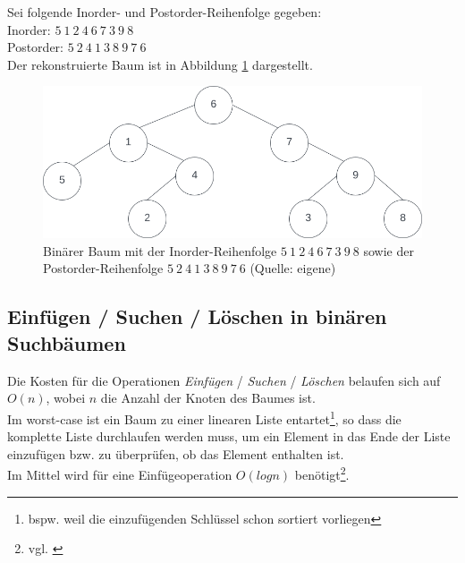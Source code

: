 \noindent
Sei folgende Inorder- und Postorder-Reihenfolge gegeben:\\

\noindent
Inorder: $5\ 1\ 2\ 4\ 6\ 7\ 3\ 9\ 8$\\
Postorder: $5\ 2\ 4\ 1\ 3\ 8\ 9\ 7\ 6$\\

\noindent
Der rekonstruierte Baum ist in Abbildung \ref{fig:inpost} dargestellt.


\begin{figure}
    \begin{center}
        \includegraphics[scale=0.4]{chapters/Datenstrukturen und Algorithmen/img/inpost}
        \caption{Binärer Baum mit der Inorder-Reihenfolge $5\ 1\ 2\ 4\ 6\ 7\ 3\ 9\ 8$ sowie der Postorder-Reihenfolge $5\ 2\ 4\ 1\ 3\ 8\ 9\ 7\ 6$  (Quelle: eigene)}
        \label{fig:inpost}
    \end{center}
\end{figure}


\subsection{Einfügen / Suchen / Löschen in binären Suchbäumen}

Die Kosten für die Operationen \textit{Einfügen} / \textit{Suchen} / \textit{Löschen} belaufen sich auf $O(n)$, wobei $n$ die Anzahl der Knoten des Baumes ist.\\
Im worst-case ist ein Baum zu einer linearen Liste entartet\footnote{
    bspw. weil die einzufügenden Schlüssel schon sortiert vorliegen
}, so dass die komplette Liste durchlaufen werden muss, um ein Element in das Ende der Liste einzufügen bzw. zu überprüfen, ob das Element enthalten ist.\\

\noindent
Im Mittel wird für eine Einfügeoperation $O(log n)$ benötigt\footnote{
    vgl. \cite[136 ff.]{GD18d}
}.\\


